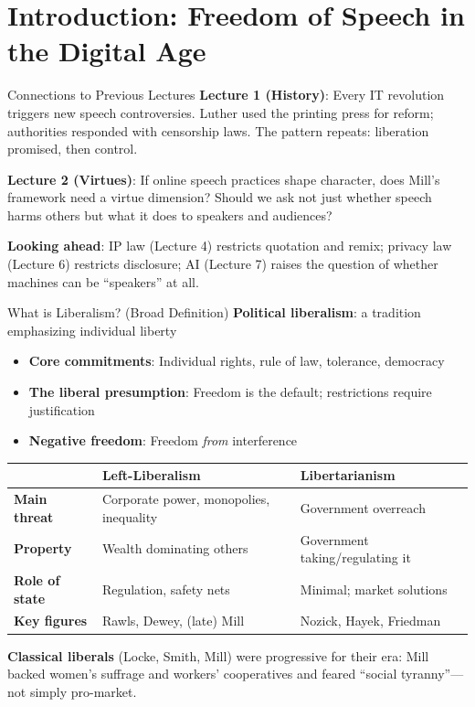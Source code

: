 ﻿\documentclass[aspectratio=169,11pt]{beamer}
\begin{document}
\section{Introduction: Freedom of Speech in the Digital Age}

\begin{frame}{Connections to Previous Lectures}
\textbf{Lecture 1 (History)}: Every IT revolution triggers new speech controversies. Luther used the printing press for reform; authorities responded with censorship laws. The pattern repeats: liberation promised, then control.

\vspace{0.2cm}
\textbf{Lecture 2 (Virtues)}: If online speech practices shape character, does Mill's framework need a virtue dimension? Should we ask not just whether speech harms others but what it does to speakers and audiences?

\vspace{0.2cm}
\textbf{Looking ahead}: IP law (Lecture 4) restricts quotation and remix; privacy law (Lecture 6) restricts disclosure; AI (Lecture 7) raises the question of whether machines can be ``speakers'' at all.
\end{frame}

\begin{frame}{What is Liberalism? (Broad Definition)}
\textbf{Political liberalism}: a tradition emphasizing individual liberty
\begin{itemize}
    \item \textbf{Core commitments}: Individual rights, rule of law, tolerance, democracy
    \item \textbf{The liberal presumption}: Freedom is the default; restrictions require justification
    \item \textbf{Negative freedom}: Freedom \textit{from} interference
\end{itemize}

\vspace{0.1cm}
\begin{table}[h]
\centering
\small
\begin{tabular}{>{\bfseries}l p{4.3cm} p{4.3cm}}
\toprule
& \textbf{Left-Liberalism} & \textbf{Libertarianism} \\
\midrule
Main threat & Corporate power, monopolies, inequality & Government overreach \\
Property & Wealth dominating others & Government taking/regulating it \\
Role of state & Regulation, safety nets & Minimal; market solutions \\
Key figures & Rawls, Dewey, (late) Mill & Nozick, Hayek, Friedman \\
\bottomrule
\end{tabular}
\end{table}

\vspace{0.1cm}
\textbf{Classical liberals} (Locke, Smith, Mill) were progressive for their era: Mill backed women's suffrage and workers' cooperatives and feared ``social tyranny''---not simply pro-market.
\end{frame}
\end{document}
